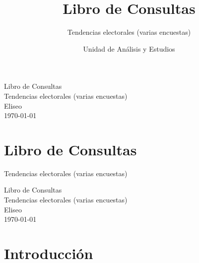 \documentclass[
  letterpaper,
  DIV=11,
  numbers=noendperiod]{scrreprt}
\title{Libro de Consultas}
\subtitle{Tendencias electorales (varias encuestas)}
\author{Unidad de Análisis y Estudios}
\date{}
\renewcommand*\contentsname{Table of contents}
\newcommand\contentsname{Table of contents}
\begin{document}
\maketitle

\thispagestyle{empty}
\pagecolor{coverblue}
\color{coverwhite}

\vspace*{\fill}
\begin{center}
{\robotoMedium\fontsize{36}{42}\selectfont Libro de Consultas}\\[1.5em]
{\robotoRegular\fontsize{22}{28}\selectfont Tendencias electorales (varias encuestas)}\\[2em]
{\robotoLight\fontsize{18}{24}\selectfont Eliseo}\\[2em]
\today
\end{center}
\vspace*{\fill}

\pagecolor{white}
\clearpage

\renewcommand*\contentsname{Table of contents}
{
\hypersetup{linkcolor=}
\setcounter{tocdepth}{2}
\tableofcontents
}


\chapter{Libro de Consultas}\label{libro-de-consultas}

Tendencias electorales (varias encuestas)

\hfill\break

\thispagestyle{empty}
\pagecolor{coverblue}
\color{coverwhite}

\vspace*{\fill}
\begin{center}
{\robotoMedium\fontsize{36}{42}\selectfont Libro de Consultas}\\[1.5em]
{\robotoRegular\fontsize{22}{28}\selectfont Tendencias electorales (varias encuestas)}\\[2em]
{\robotoLight\fontsize{18}{24}\selectfont Eliseo}\\[2em]
\today
\end{center}
\vspace*{\fill}

\pagecolor{white}
\clearpage


\chapter{Introducción}\label{introducciuxf3n}
\end{document}
